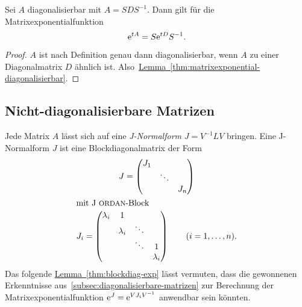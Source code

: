 \begin{corollary}
    Sei $A$ diagonalisierbar mit $A = S D S^{-1}$.
    Dann gilt für die Matrixexponentialfunktion
    \begin{equation*}
        \mathrm{e}^{t A} = S \mathrm{e}^{t D} S^{-1}.
    \end{equation*}
\end{corollary}

\begin{proof}
    $A$ ist nach Definition genau dann diagonalisierbar, wenn $A$ zu einer Diagonalmatrix $D$ ähnlich ist.
    Also~\hyperref[thm:matrixexponential-diagonalisierbar]{Lemma~\ref*{thm:matrixexponential-diagonalisierbar}}.
\end{proof}

\subsection{Nicht-diagonalisierbare Matrizen}\label{subsec:nichtdiagonalisierbare-matrizen}
Jede Matrix $A$ lässt sich auf eine \emph{J-Normalform} $J = V^{-1} L V$ bringen.
Eine J-Normalform $J$ ist eine Blockdiagonalmatrix der Form
\begin{gather*}
    J = \begin{pmatrix}
            J_1 &        &  \\
                & \ddots & \\
                &        & J_n
    \end{pmatrix}\\
    \intertext{mit J\textc{ordan}-Block}
    J_i = \begin{pmatrix}
              \lambda_i & 1         &        & \\
                        & \lambda_i & \ddots & \\
                        &           & \ddots & 1 \\
                        &           &        & \lambda_i
    \end{pmatrix}
    \qquad (i = 1,\dots,n).
\end{gather*}
Das folgende \hyperref[thm:blockdiag-exp]{Lemma~\ref*{thm:blockdiag-exp}} lässt vermuten,
dass die gewonnenen Erkenntnisse aus~\autoref{subsec:diagonalisierbare-matrizen} zur Berechnung der
Matrixexponentialfunktion $\mathrm{e}^{J} = \mathrm{e}^{V J_i V^{-1}}$ anwendbar sein könnten.


